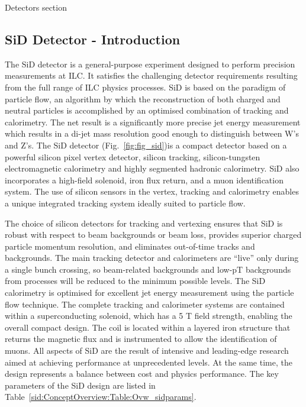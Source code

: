   Detectors section
\subsection{SiD Detector - Introduction}
The SiD detector is a general-purpose experiment designed to perform precision measurements
at ILC. It satisfies the challenging detector requirements resulting from the full range of ILC physics processes. SiD is based on the paradigm of particle flow, an algorithm by which
the reconstruction of both charged and neutral particles is accomplished by an optimised
combination of tracking and calorimetry. The net result is a significantly more precise jet
energy measurement which results in a di-jet mass resolution good enough to distinguish
between W’s and Z’s.
The SiD detector (Fig.~\ref{fig:fig_sid})is a compact detector based on a powerful silicon
pixel vertex detector, silicon tracking, silicon-tungsten electromagnetic calorimetry and
highly segmented hadronic calorimetry. 
SiD also incorporates a high-field solenoid, iron
flux return, and a muon identification system. The use of silicon sensors in the vertex, tracking
and calorimetry enables a unique integrated tracking system ideally suited to particle
flow.

The choice of silicon detectors for tracking and vertexing ensures that SiD is robust
with respect to beam backgrounds or beam loss, provides superior charged particle momentum
resolution, and eliminates out-of-time tracks and backgrounds. The main tracking
detector and calorimeters are “live” only during a single bunch crossing, so beam-related
backgrounds and low-pT backgrounds from \gamgam processes will be reduced to the minimum
possible levels. The SiD calorimetry is optimised for excellent jet energy measurement
using the particle flow technique. The complete tracking and calorimeter systems are contained
within a superconducting solenoid, which has a 5 T field strength, enabling the overall
compact design. The coil is located within a layered iron structure that returns the magnetic flux and is instrumented to allow the identification of muons. All aspects of SiD are the result of intensive and leading-edge research aimed at achieving
performance at unprecedented levels. At the same time, the design represents a balance between cost
and physics performance. The key parameters of the SiD design are listed in  Table~\ref{sid:ConceptOverview:Table:Ovw_sidparams}.

